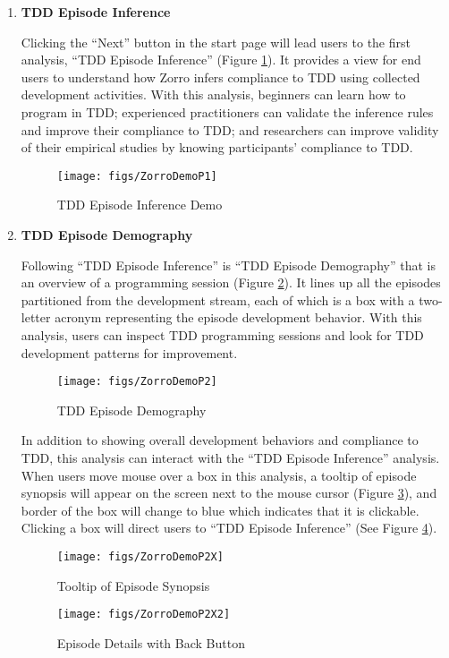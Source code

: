 \begin{enumerate}
\item{\textbf{TDD Episode Inference}}

Clicking the ``Next'' button in the start page will lead users to the first analysis, ``TDD Episode Inference'' (Figure \ref{fig:ZorroDemoP1}). It provides a view for end users to understand how Zorro infers compliance to TDD using collected development activities. With this analysis, beginners can learn how to program in TDD; experienced practitioners can validate the inference rules and improve their compliance to TDD; and researchers can improve validity of their empirical studies by knowing participants' compliance to TDD. 

\begin{figure}[htbp]
  \centering
  \texttt{[image: figs/ZorroDemoP1]}
  \caption{TDD Episode Inference Demo}
  \label{fig:ZorroDemoP1}
\end{figure}


\newpage
\item{\textbf{TDD Episode Demography}}

Following ``TDD Episode Inference'' is ``TDD Episode Demography'' that is an overview of a programming session (Figure \ref{fig:ZorroDemoP2}). It lines up all the episodes partitioned from the development stream, each of which is a box with a two-letter acronym representing the episode development behavior. With this analysis, users can inspect TDD programming sessions and look for TDD development patterns for improvement.  

\begin{figure}[htbp]
  \centering
  \texttt{[image: figs/ZorroDemoP2]}
  \caption{TDD Episode Demography}
  \label{fig:ZorroDemoP2}
\end{figure}
In addition to showing overall development behaviors and compliance to TDD, this analysis can interact with the ``TDD Episode Inference'' analysis. When users move mouse over a box in this analysis, a tooltip of episode synopsis will appear on the screen next to the mouse cursor (Figure \ref{fig:ZorroDemoP2X}), and border of the box will change to blue which indicates that it is clickable. Clicking a box will direct users to ``TDD Episode Inference'' (See Figure \ref{fig:ZorroDemoP2X2}). 
\begin{figure}[ht]
  \centering
  \texttt{[image: figs/ZorroDemoP2X]}
  \caption{Tooltip of Episode Synopsis}
  \label{fig:ZorroDemoP2X}
\end{figure}
\begin{figure}[ht]
  \centering
  \texttt{[image: figs/ZorroDemoP2X2]}
  \caption{Episode Details with Back Button}
  \label{fig:ZorroDemoP2X2}
\end{figure}


\end{enumerate}
